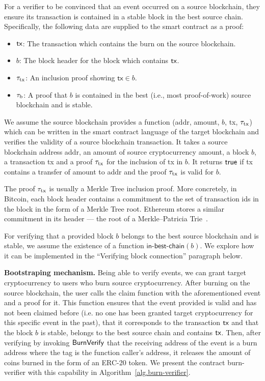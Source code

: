 For a verifier to be convinced that an event occurred on a source blockchain, they ensure its transaction is contained in a stable block in the best source chain. Specifically, the following data are supplied to the smart contract as a proof:

\begin{itemize}
  \item $\textsf{tx}$: The transaction which contains the burn on the source blockchain.
  \item $b$: The block header for the block which contains $\textsf{tx}$.
  \item $\tau_\text{tx}$: An inclusion proof showing $\mathsf{tx} \in b$.
  \item $\tau_\text{b}$: A proof that $b$ is contained in the best (i.e., most proof-of-work) source blockchain and is stable.
\end{itemize}

We assume the source blockchain provides a function \verifytx(\textsf{addr}, \textsf{amount}, $b$, \textsf{tx}, $\tau_\text{tx}$) which can be written in the smart contract language of the target blockchain and verifies the validity of a source blockchain transaction. It takes a source blockchain address \textsf{addr}, an amount of source cryptocurrency \textsf{amount}, a block $b$, a transaction \textsf{tx} and a proof $\tau_\text{tx}$ for the inclusion of \textsf{tx} in $b$. It returns $\mathsf{true}$ if \textsf{tx} contains a transfer of \textsf{amount} to \textsf{addr} and the proof $\tau_\text{tx}$ is valid for $b$.

The proof $\tau_\text{tx}$ is usually a Merkle Tree inclusion proof. More concretely, in Bitcoin, each block header contains a commitment to the set of transaction ids in the block in the form of a Merkle Tree root. Ethereum stores a similar commitment in its header --- the root of a Merkle--Patricia Trie~\cite{wood2014ethereum}.

For verifying that a provided block $b$ belongs to the best source blockchain and is stable, we assume the existence of a function $\textsf{in-best-chain}(b)$. We explore how it can be implemented in the ``Verifying block connection'' paragraph below.

\noindent
\textbf{Bootstraping mechanism.}
Being able to verify events, we can grant target cryptocurrency to users who burn source cryptocurrency. After burning on the source blockchain, the user calls the \textsf{claim} function with the aforementioned event and a proof for it. This function ensures that the event provided is valid and has not been claimed before (i.e. no one has been granted target cryptocurrency for this specific event in the past), that it corresponds to the transaction $\textsf{tx}$ and that the block $b$ is stable, belongs to the best source chain and contains $\textsf{tx}$. Then, after verifying by invoking $\mathsf{BurnVerify}$ that the receiving address of the event is a burn address where the tag is the function caller's address, it releases the amount of coins burned in the form of an ERC-20 token. We present the contract \textsf{burn-verifier} with this capability in Algorithm~\ref{alg.burn-verifier}.

